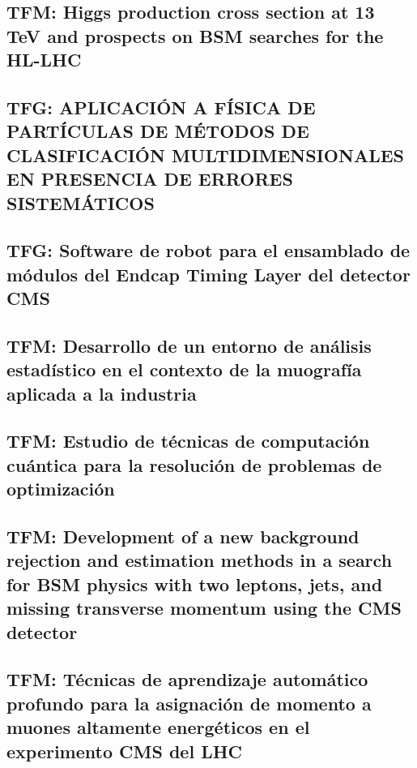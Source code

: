 \documentclass[a4paper, 11pt, twoside, openright]{report}
\begin{document}
\subsection{TFM: Higgs production cross section at 13 TeV and prospects on BSM searches for the HL-LHC}


\subsection{TFG: APLICACIÓN A FÍSICA DE PARTÍCULAS DE MÉTODOS DE CLASIFICACIÓN MULTIDIMENSIONALES EN PRESENCIA DE ERRORES SISTEMÁTICOS}


\subsection{TFG: Software de robot para el ensamblado de módulos del Endcap Timing Layer del detector CMS}


\subsection{TFM: Desarrollo de un entorno de análisis estadístico en el contexto de la muografía aplicada a la industria}


\subsection{TFM: Estudio de técnicas de computación cuántica para la resolución de problemas de optimización}


\subsection{TFM: Development of a new background rejection and estimation methods in a search for BSM physics with two leptons, jets, and missing transverse momentum using the CMS detector}


\subsection{TFM: Técnicas de aprendizaje automático profundo para la asignación de momento a muones altamente energéticos en el experimento CMS del LHC}

\end{document}
